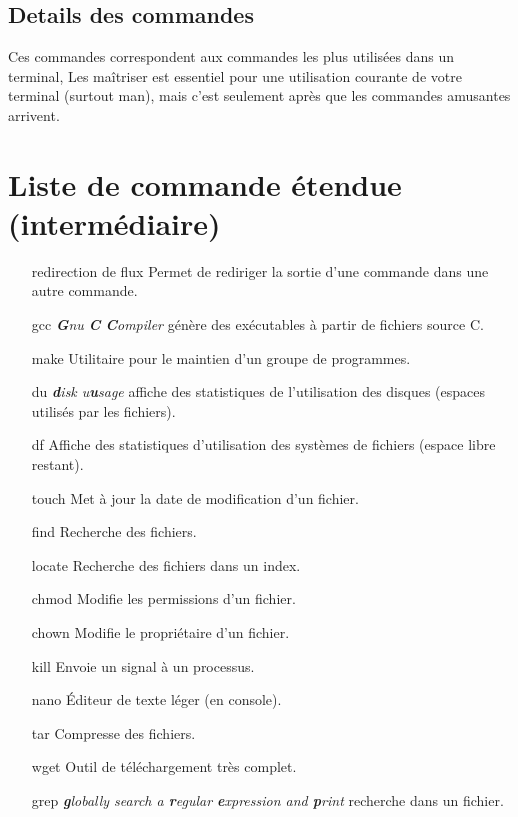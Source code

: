 \documentclass[french, a4paper, 12pt, titlepage]{article}
\begin{document}
\subsection{Details des commandes}








Ces commandes correspondent aux commandes les plus utilisées dans un terminal,
Les maîtriser est essentiel pour une utilisation courante de votre terminal (surtout man), mais c'est seulement après que les commandes amusantes arrivent.

\newpage

\section{Liste de commande étendue (intermédiaire)}
\begin{enumerate}
\item[redirection de flux] Permet de rediriger la sortie d'une commande dans une autre commande.
\item[gcc] \emph{\textbf{G}nu \textbf{C} \textbf{C}ompiler}  génère des exécutables à partir de fichiers source C.
\item[make] Utilitaire pour le maintien d'un groupe de programmes.
\item[du] \emph{\textbf{d}isk u\textbf{u}sage} affiche des statistiques de l'utilisation des disques (espaces utilisés par les fichiers).
\item[df] Affiche des statistiques d'utilisation des systèmes de fichiers (espace libre restant).
\item[touch] Met à jour la date de modification d'un fichier.
\item[find] Recherche des fichiers.
\item[locate] Recherche des fichiers dans un index.
\item[chmod] Modifie les permissions d'un fichier.
\item[chown] Modifie le propriétaire d'un fichier.
\item[kill] Envoie un signal à un processus.
\item[nano] Éditeur de texte léger (en console).
\item[tar] Compresse des fichiers.
\item[wget] Outil de téléchargement très complet.
\item[grep] \emph{\textbf{g}lobally search a \textbf{r}egular \textbf{e}xpression and \textbf{p}rint} recherche dans un fichier.
\end{enumerate}
\end{document}
